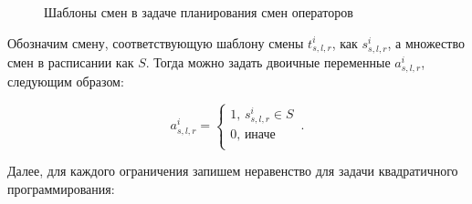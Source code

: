 \documentclass[times,specification,annotation]{itmo-student-thesis}
\begin{document}
\begin{figure}
\caption{Шаблоны смен в задаче планирования смен операторов}\label{fig2:support_shift_templates}
\centering

\end{figure}

Обозначим смену, соответствующую шаблону смены $t^i_{s, l, r}$, как $s^i_{s, l, r}$, а множество смен в расписании как $S$.
Тогда можно задать двоичные переменные $a^i_{s, l, r}$, следующим образом:

\begin{equation} a^i_{s, l, r} = \begin{cases} 1,\, s^i_{s, l, r} \in S \\ 0,\, \text{иначе} \\ \end{cases}\,. \end{equation}

Далее, для каждого ограничения запишем неравенство для задачи квадратичного программирования:
\end{document}
